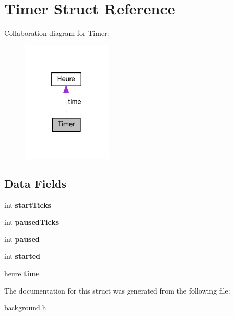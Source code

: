 \hypertarget{structTimer}{}\section{Timer Struct Reference}
\label{structTimer}


Collaboration diagram for Timer\+:\nopagebreak
\begin{figure}[H]
\begin{center}
\leavevmode
\includegraphics[width=124pt]{structTimer__coll__graph}
\end{center}
\end{figure}
\subsection*{Data Fields}
\begin{DoxyCompactItemize}
\item 
\mbox{\label{structTimer_ad6e980d932698bb8fd82498e6c47696c}} 
int {\bfseries start\+Ticks}
\item 
\mbox{\label{structTimer_a656a26aa06175d577077ac6181e772fd}} 
int {\bfseries paused\+Ticks}
\item 
\mbox{\label{structTimer_a7fb9c61c8c6b3277fa1a33a054987704}} 
int {\bfseries paused}
\item 
\mbox{\label{structTimer_ae61fe29f9f0ed5eb7eed278b3dee29f0}} 
int {\bfseries started}
\item 
\mbox{\label{structTimer_ac7f0cfc2a6dadae0951dd728c60eba69}} 
\hyperlink{structheure}{heure} {\bfseries time}
\end{DoxyCompactItemize}


The documentation for this struct was generated from the following file\+:\begin{DoxyCompactItemize}
\item 
background.\+h\end{DoxyCompactItemize}
